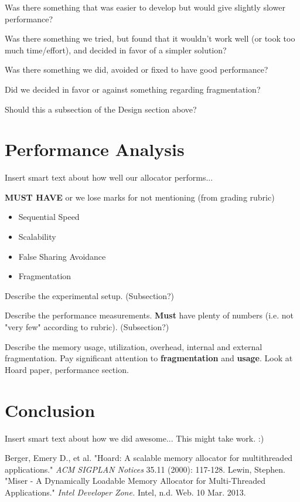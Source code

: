 \documentclass{article}
\begin{document}
Was there something that was easier to develop but would give slightly slower
performance?

Was there something we tried, but found that it wouldn't work well (or took too 
much time/effort), and decided in favor of a simpler solution?

Was there something we did, avoided or fixed to have good performance?

Did we decided in favor or against something regarding fragmentation?

Should this a subsection of the Design section above?

\newpage
\section{Performance Analysis}

Insert smart text about how well our allocator performs...

\textbf{MUST HAVE} or we lose marks for not mentioning (from grading rubric)
\begin{itemize}
	\item Sequential Speed
	\item Scalability
	\item False Sharing Avoidance
	\item Fragmentation
\end{itemize}

Describe the experimental setup. (Subsection?)

Describe the performance measurements. \textbf{Must} have plenty of numbers 
(i.e. not "very few" according to rubric). (Subsection?)

Describe the memory usage, utilization, overhead, internal and external 
fragmentation. Pay significant attention to \textbf{fragmentation} and 
\textbf{usage}. Look at Hoard paper, performance section. 

\newpage
\section{Conclusion}

Insert smart text about how we did awesome... This might take work. :)

\newpage

\begin{thebibliography}{9}
	
		Berger, Emery D., et al.
		"Hoard: A scalable memory allocator for multithreaded applications."
		\textit{ACM SIGPLAN Notices} 35.11 
		(2000): 
		117-128.
		Lewin, Stephen.
		"Miser - A Dynamically Loadable Memory Allocator for Multi-Threaded Applications."
		\textit{Intel Developer Zone.}
		Intel, 
		n.d. Web. 10 Mar. 2013.

\end{thebibliography}
\end{document}
